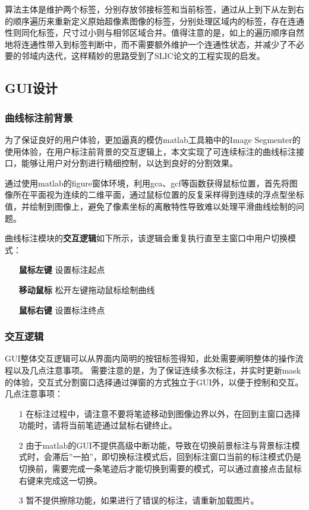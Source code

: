 \documentclass[UTF8]{ctexart}
\begin{document}
算法主体是维护两个标签，分别存放邻接标签和当前标签，通过从上到下从左到右的顺序遍历来重新定义原始超像素图像的标签，分别处理区域内的标签，存在连通性则同化标签，尺寸过小则与相邻区域合并。值得注意的是，如上的遍历顺序自然地将连通性带入到标签判断中，而不需要额外维护一个连通性状态，并减少了不必要的邻域内迭代，这样精妙的思路受到了SLIC论文的工程实现的启发。


\subsection{GUI设计}
\subsubsection{曲线标注前背景}\label{use}
为了保证良好的用户体验，更加逼真的模仿matlab工具箱中的Image Segmenter的使用体验，在用户标注前背景的交互逻辑上，本文实现了可连续标注的曲线标注接口，能够让用户对分割进行精细控制，以达到良好的分割效果。

通过使用matlab的figure窗体环境，利用gca、gcf等函数获得鼠标位置，首先将图像所在平面视为连续的二维平面，通过鼠标位置的反复采样得到连续的浮点型坐标值，并绘制到图像上，避免了像素坐标的离散特性导致难以处理平滑曲线绘制的问题。

曲线标注模块的\textbf{交互逻辑}如下所示，该逻辑会重复执行直至主窗口中用户切换模式：
\begin{itemize}
    \item[\textbf{鼠标左键}]设置标注起点
    \item[\textbf{移动鼠标}]松开左键拖动鼠标绘制曲线
    \item[\textbf{鼠标右键}]设置标注终点  
\end{itemize}

\subsubsection{交互逻辑}
GUI整体交互逻辑可以从界面内简明的按钮标签得知，此处需要阐明整体的操作流程以及几点注意事项。
需要注意的是，为了保证连续多次标注，并实时更新mask的体验，交互式分割窗口选择通过弹窗的方式独立于GUI外，以便于控制和交互。几点注意事项：
\begin{itemize}
    \item[1]在标注过程中，请注意不要将笔迹移动到图像边界以外，在回到主窗口选择功能时，请将当前笔迹通过鼠标右键终止。
    \item[2]由于matlab的GUI不提供高级中断功能，导致在切换前景标注与背景标注模式时，会滞后”一拍”，即切换标注模式后，回到标注窗口当前的标注模式仍是切换前，需要完成一条笔迹后才能切换到需要的模式，可以通过直接点击鼠标右键来完成这一切换。
    \item[3]暂不提供擦除功能，如果进行了错误的标注，请重新加载图片。
\end{itemize}
\end{document}
